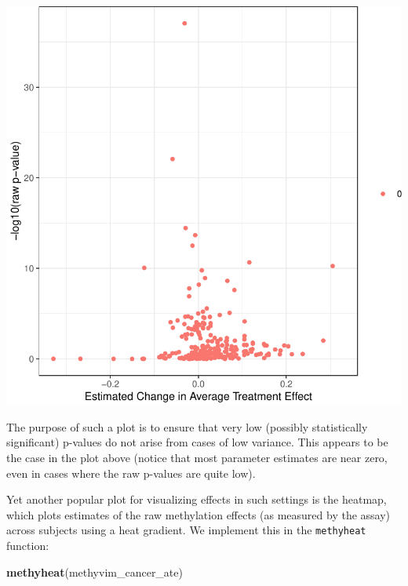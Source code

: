 \documentclass[9pt,a4paper,]{extarticle}
\newenvironment{Shaded}{\begin{snugshade}}{\end{snugshade}}
\newcommand{\KeywordTok}[1]{\textcolor[rgb]{0.13,0.29,0.53}{\textbf{#1}}}
\newcommand{\NormalTok}[1]{#1}
\theoremstyle{definition}
\theoremstyle{definition}
\theoremstyle{definition}
\theoremstyle{remark}
\begin{document}
\begin{center}\includegraphics{paper_BiocF1000_files/figure-latex/methyvim-volcano-1} \end{center}

The purpose of such a plot is to ensure that very low (possibly statistically
significant) p-values do not arise from cases of low variance. This appears to
be the case in the plot above (notice that most parameter estimates are near
zero, even in cases where the raw p-values are quite low).

Yet another popular plot for visualizing effects in such settings is the
heatmap, which plots estimates of the raw methylation effects (as measured by
the assay) across subjects using a heat gradient. We implement this in the
\texttt{methyheat} function:

\begin{Shaded}
\begin{Highlighting}[]
\KeywordTok{methyheat}\NormalTok{(methyvim_cancer_ate)}
\end{Highlighting}
\end{Shaded}
\end{document}
